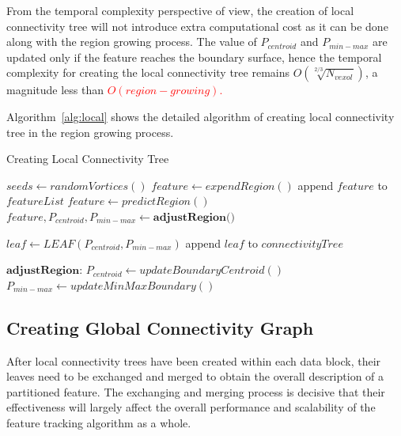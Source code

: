 \documentclass[10pt, conference, compsocconf]{IEEEtran}
\begin{document}
From the temporal complexity perspective of view, the creation of local connectivity tree will not introduce extra computational cost as it can be done along with the region growing process. The value of $P_{centroid}$ and $P_{min-max}$ are updated only if the feature reaches the boundary surface, hence the temporal complexity for creating the local connectivity tree remains ${O(\sqrt[2/3]{N_{vexol}})}$, a magnitude less than \textcolor{red}{$O(region-growing)$.}

Algorithm~\ref{alg:local} shows the detailed algorithm of creating local connectivity tree in the region growing process.
\begin{algorithm}
\caption{Creating Local Connectivity Tree}
\label{alg:local}

\begin{algorithmic}
		\STATE $seeds \leftarrow randomVortices()$
			\STATE $feature \leftarrow expendRegion()$
			\STATE append $feature$ to $featureList$
		\ENDFOR	
	\ELSE
			\STATE $feature \leftarrow predictRegion()$
			\STATE $feature,P_{centroid},P_{min-max} \leftarrow \textbf{adjustRegion()}$
			
			\STATE $leaf \leftarrow LEAF(P_{centroid}, P_{min-max})$
			\STATE append $leaf$ to $connectivityTree$
		\ENDFOR
	\ENDIF
\end{algorithmic}

\begin{algorithmic} \STATE \end{algorithmic}	%

\begin{algorithmic}
\STATE $\textbf{adjustRegion:}$
		\STATE $P_{centroid} \leftarrow updateBoundaryCentroid()$
		\STATE $P_{min-max} \leftarrow updateMinMaxBoundary()$
	\ENDIF
\end{algorithmic}
\end{algorithm}

\subsection{Creating Global Connectivity Graph}

After local connectivity trees have been created within each data block, their leaves need to be exchanged and merged to obtain the overall description of a partitioned feature. The exchanging and merging process is decisive that their effectiveness will largely affect the overall performance and scalability of the feature tracking algorithm as a whole.
\end{document}
